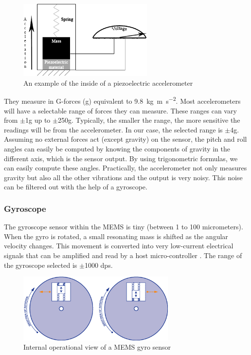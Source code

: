 \documentclass[a4paper,12pt,oneside]{book}
\begin{document}
\begin{figure}[!htb]
\centering
\includegraphics[width=0.6\textwidth]{images/accel_mems}
\caption{An example of the inside of a piezoelectric accelerometer\cite{tonik}}
\label{fig:AHRS}
\end{figure}

They measure in G-forces (g) equivalent to \SI{9.8}{\kilo\gram\meter\per\second\squared}. Most accelerometers will have a selectable range of forces they can measure. These ranges can vary from $\pm$1g up to $\pm$250g. Typically, the smaller the range, the more sensitive the readings will be from the accelerometer. In our case, the selected range is $\pm$4g.\cite{tonik}\\

Assuming no external forces act (except gravity) on the sensor, the pitch and roll angles can easily be computed by knowing the components of gravity in the different axis, which is the sensor output. By using trigonometric formulas, we can easily compute these angles. Practically, the accelerometer not only measures gravity but also all the other vibrations and the output is very noisy. This noise can be filtered out with the help of a gyroscope.\\

\subsubsection{Gyroscope}
The gyroscope sensor within the MEMS is tiny (between 1 to 100 micrometers). When the gyro is rotated, a small resonating mass is shifted as the angular velocity changes. This movement is converted into very low-current electrical signals that can be amplified and read by a host micro-controller \cite{gyro}. The range of the gyroscope selected is $\pm$1000 dps.\\

\begin{figure}[!htb]
\centering
\includegraphics[width=0.7\textwidth]{images/gyro_mems}
\caption{Internal operational view of a MEMS gyro sensor\cite{gyro}}
\end{figure}
\end{document}
